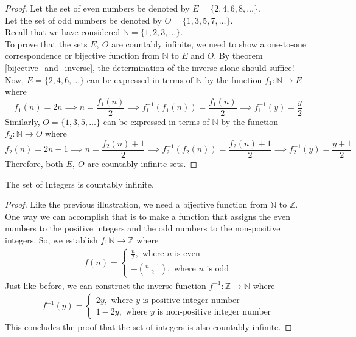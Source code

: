 \begin{proof}
    Let the set of even numbers be denoted by $E=\{2,4,6,8,\dots\}$.\\
    Let the set of odd numbers be denoted by $O=\{1,3,5,7,\dots\}$.\\
    Recall that we have considered $\mathbb{N}=\{1,2,3,\dots\}$.\\
    To prove that the sets $E,\ O$ are countably infinite, we need to show a one-to-one correspondence or bijective function from $\mathbb{N}$ to $E$ and $O$. By theorem \eqref{bijective_and_inverse}, the determination of the inverse alone should suffice!\\
    Now, $E=\{2,4,6,\dots\}$ can be expressed in terms of $\mathbb{N}$ by the function $f_1:\mathbb{N}\to E$ where $$f_1(n)=2n\implies n=\frac{f_1(n)}{2}\implies f^{-1}_1(f_1(n))=\frac{f_1(n)}{2}\implies f^{-1}_1(y)=\frac{y}{2}$$
    Similarly, $O=\{1,3,5,\dots\}$ can be expressed in terms of $\mathbb{N}$ by the function $f_2:\mathbb{N}\to O$ where $$f_2(n)=2n-1\implies n=\frac{f_2(n)+1}{2}\implies f^{-1}_2(f_2(n))=\frac{f_2(n)+1}{2}\implies f^{-1}_2(y)=\frac{y+1}{2}$$
    Therefore, both $E,\ O$ are countably infinite sets.
\end{proof}
\begin{Example}
    The set of Integers is countably infinite.
\end{Example}
\begin{proof}
    Like the previous illustration, we need a bijective function from $\mathbb{N}$ to $\mathbb{Z}$. One way we can accomplish that is to make a function that assigns the even numbers to the positive integers and the odd numbers to the non-positive integers. So, we establish $f : \mathbb{N} \to \mathbb{Z}$ where
    \begin{align*}
        f(n)=\begin{cases}
            \frac{n}{2},\text{ where }n\text{ is even}\\
            -(\frac{n-1}{2}),\text{ where }n\text{ is odd}
        \end{cases}
    \end{align*}
    Just like before, we can construct the inverse function $f^{-1} : \mathbb{Z}\to\mathbb{N}$ where
    \begin{align*}
        f^{-1}(y)=\begin{cases}
            2y,\text{ where }y\text{ is positive integer number}\\
            1-2y,\text{ where }y\text{ is non-positive integer number}
        \end{cases}
    \end{align*}
    This concludes the proof that the set of integers is also countably infinite.
\end{proof}
